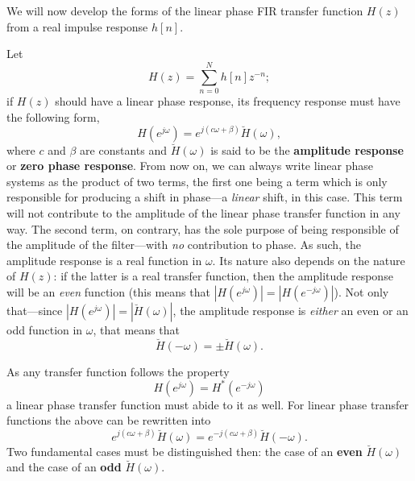 \documentclass[\documentfontsize, twocolumn]{\classname}
\begin{document}
We will now develop the forms of the linear phase FIR transfer function $H(z)$ from a real impulse response $h[n]$.

Let
\[
    H(z) = \sum_{n=0}^N h[n]z^{-n};
\]
if $H(z)$ should have a linear phase response, its frequency response must have the following form,
\begin{equation}\label{eqn:linearPhaseTransferFunctionForm}
    H(e^{j\omega}) = e^{j(c\omega + \beta)}\breve{H}(\omega),
\end{equation}
where $c$ and $\beta$ are constants and $\breve{H}(\omega)$ is said to be the \textbf{amplitude response} or \textbf{zero phase response}. From now on, we can always write linear phase systems as the product of two terms, the first one being a term which is only responsible for producing a shift in phase---a \emph{linear} shift, in this case. This term will not contribute to the amplitude of the linear phase transfer function in any way. The second term, on contrary, has the sole purpose of being responsible of the amplitude of the filter---with \emph{no} contribution to phase. As such, the amplitude response is a real function in $\omega$. Its nature also depends on the nature of $H(z)$: if the latter is a real transfer function, then the amplitude response will be an \emph{even} function (this means that $\left|H(e^{j\omega})\right| = \left|H(e^{-j\omega})\right|$). Not only that---since $\left|H(e^{j\omega})\right| = \left|\breve{H}(\omega)\right|$, the amplitude response is \emph{either} an even or an odd function in $\omega$, that means that
\[
    \breve{H}(-\omega) = \pm\breve{H}(\omega).
\]

As any transfer function follows the property
\begin{equation}\label{eqn:transferFunctionSymmetryProperty}
    H(e^{j\omega}) = H^*(e^{-j\omega})
\end{equation}
a linear phase transfer function must abide to it as well. For linear phase transfer functions the above can be rewritten into
\[
    e^{j(c\omega + \beta)}\breve{H}(\omega) = e^{-j(c\omega + \beta)}\breve{H}(-\omega).
\]
Two fundamental cases must be distinguished then: the case of an \textbf{even} $\breve{H}(\omega)$ and the case of an \textbf{odd} $\breve{H}(\omega)$.
\end{document}
